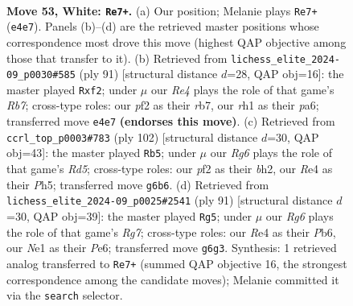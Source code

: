 \documentclass[11pt]{article}
\begin{document}
\clearpage

\begin{figure}[p]\centering
\begin{subfigure}{0.46\textwidth}\centering
\resizebox{\linewidth}{!}{%
\newchessgame
\chessboard[
  setfen={8/7k/6R1/2p4P/4R3/8/1P3p2/3KN2r w - - 7 53},
  showmover=false,
  pgfstyle=straightmove, color=movearrow, markmove={e4-e7}
]}
\caption{}
\end{subfigure}\hfill
\begin{subfigure}{0.46\textwidth}\centering
\resizebox{\linewidth}{!}{%
\newchessgame
\chessboard[
  setfen={4k3/1R3p2/Pn6/6Kp/8/8/1r3P1P/8 b - - 3 46},
  showmover=false,
  pgfstyle=straightmove, color=movearrow, markmove={b2-f2}
]}
\caption{}
\end{subfigure}
\\[4pt]
\begin{subfigure}{0.46\textwidth}\centering
\resizebox{\linewidth}{!}{%
\newchessgame
\chessboard[
  setfen={8/6p1/4k2p/3R3P/4P3/r2NK3/7b/8 w - - 3 52},
  showmover=false,
  pgfstyle=straightmove, color=movearrow, markmove={d5-b5}
]}
\caption{}
\end{subfigure}\hfill
\begin{subfigure}{0.46\textwidth}\centering
\resizebox{\linewidth}{!}{%
\newchessgame
\chessboard[
  setfen={8/p7/1p1Rpnk1/8/P1P5/5K2/6r1/8 b - - 6 46},
  showmover=false,
  pgfstyle=straightmove, color=movearrow, markmove={g2-g5}
]}
\caption{}
\end{subfigure}
\caption{\textbf{Move 53, White: \texttt{Re7+}.} (a) Our position; Melanie plays \texttt{Re7+} (\texttt{e4e7}). Panels (b)--(d) are the retrieved master positions whose correspondence most drove this move (highest QAP objective among those that transfer to it). (b) Retrieved from \texttt{lichess\_elite\_2024-09\_p0030\#585} (ply 91) [structural distance $d$=28, QAP obj=16]: the master played \texttt{Rxf2}; under $\mu$ our \emph{Re4} plays the role of that game's \emph{Rb7}; cross-type roles: our \emph{p}f2 as their \emph{r}b7, our \emph{r}h1 as their \emph{p}a6; transferred move \texttt{e4e7} \textbf{(endorses this move)}. (c) Retrieved from \texttt{ccrl\_top\_p0003\#783} (ply 102) [structural distance $d$=30, QAP obj=43]: the master played \texttt{Rb5}; under $\mu$ our \emph{Rg6} plays the role of that game's \emph{Rd5}; cross-type roles: our \emph{p}f2 as their \emph{b}h2, our \emph{R}e4 as their \emph{P}h5; transferred move \texttt{g6b6}. (d) Retrieved from \texttt{lichess\_elite\_2024-09\_p0025\#2541} (ply 91) [structural distance $d$=30, QAP obj=39]: the master played \texttt{Rg5}; under $\mu$ our \emph{Rg6} plays the role of that game's \emph{Rg7}; cross-type roles: our \emph{R}e4 as their \emph{P}b6, our \emph{N}e1 as their \emph{P}e6; transferred move \texttt{g6g3}. Synthesis: 1 retrieved analog transferred to \texttt{Re7+} (summed QAP objective 16, the strongest correspondence among the candidate moves); Melanie committed it via the \texttt{search} selector.}
\label{fig:thought-m104}
\end{figure}
\end{document}
